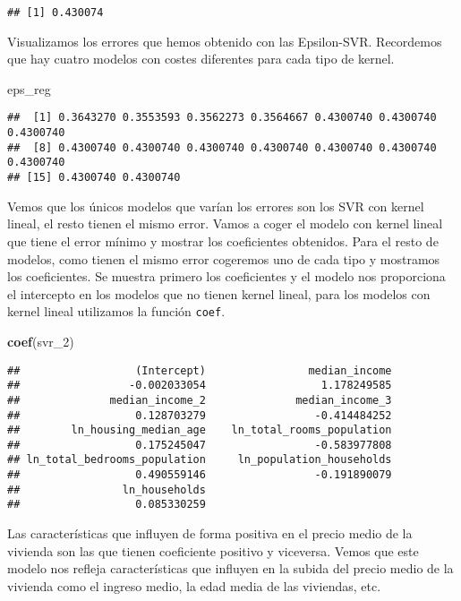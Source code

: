 \documentclass[
]{article}
\newenvironment{Shaded}{\begin{snugshade}}{\end{snugshade}}
\newcommand{\DecValTok}[1]{\textcolor[rgb]{0.00,0.00,0.81}{#1}}
\newcommand{\KeywordTok}[1]{\textcolor[rgb]{0.13,0.29,0.53}{\textbf{#1}}}
\newcommand{\NormalTok}[1]{#1}
\begin{document}
\begin{verbatim}
## [1] 0.430074
\end{verbatim}

Visualizamos los errores que hemos obtenido con las Epsilon-SVR.
Recordemos que hay cuatro modelos con costes diferentes para cada tipo
de kernel.

\begin{Shaded}
\begin{Highlighting}[]
\NormalTok{eps_reg}
\end{Highlighting}
\end{Shaded}

\begin{verbatim}
##  [1] 0.3643270 0.3553593 0.3562273 0.3564667 0.4300740 0.4300740 0.4300740
##  [8] 0.4300740 0.4300740 0.4300740 0.4300740 0.4300740 0.4300740 0.4300740
## [15] 0.4300740 0.4300740
\end{verbatim}

Vemos que los únicos modelos que varían los errores son los SVR con
kernel lineal, el resto tienen el mismo error. Vamos a coger el modelo
con kernel lineal que tiene el error mínimo y mostrar los coeficientes
obtenidos. Para el resto de modelos, como tienen el mismo error
cogeremos uno de cada tipo y mostramos los coeficientes. Se muestra
primero los coeficientes y el modelo nos proporciona el intercepto en
los modelos que no tienen kernel lineal, para los modelos con kernel
lineal utilizamos la función \texttt{coef}.

\begin{Shaded}
\begin{Highlighting}[]
\KeywordTok{coef}\NormalTok{(svr_}\DecValTok{2}\NormalTok{)}
\end{Highlighting}
\end{Shaded}

\begin{verbatim}
##                  (Intercept)                median_income 
##                 -0.002033054                  1.178249585 
##              median_income_2              median_income_3 
##                  0.128703279                 -0.414484252 
##        ln_housing_median_age    ln_total_rooms_population 
##                  0.175245047                 -0.583977808 
## ln_total_bedrooms_population     ln_population_households 
##                  0.490559146                 -0.191890079 
##                ln_households 
##                  0.085330259
\end{verbatim}

Las características que influyen de forma positiva en el precio medio de
la vivienda son las que tienen coeficiente positivo y viceversa. Vemos
que este modelo nos refleja características que influyen en la subida
del precio medio de la vivienda como el ingreso medio, la edad media de
las viviendas, etc.
\end{document}

